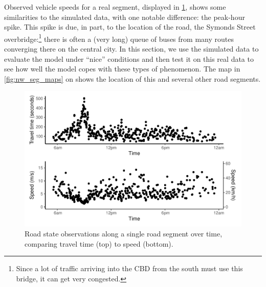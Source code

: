 Observed vehicle speeds for a real segment, displayed in \cref{fig:tt_figure}, shows some similarities to the simulated data, with one notable difference: the peak-hour spike. This spike is due, in part, to the location of the road, the Symonds Street overbridge:\footnote{Since a lot of traffic arriving into the CBD from the south must use this bridge, it can get very congested.} there is often a (very long) queue of buses from many routes converging there on the central city. In this section, we use the simulated data to evaluate the model under ``nice'' conditions and then test it on this real data to see how well the model copes with these types of phenomenon. The map in \cref{fig:nw_seg_maps} on  shows the location of this and several other road segments.


\begin{knitrout}\small
{}\color{fgcolor}\begin{figure}

{\centering \includegraphics[width=0.8\linewidth]{figure/tt_figure-1} 

}

\caption[Road state observations along a single road segment.]{Road state observations along a single road segment over time, comparing travel time (top) to speed (bottom).}\label{fig:tt_figure}
\end{figure}


\end{knitrout}
